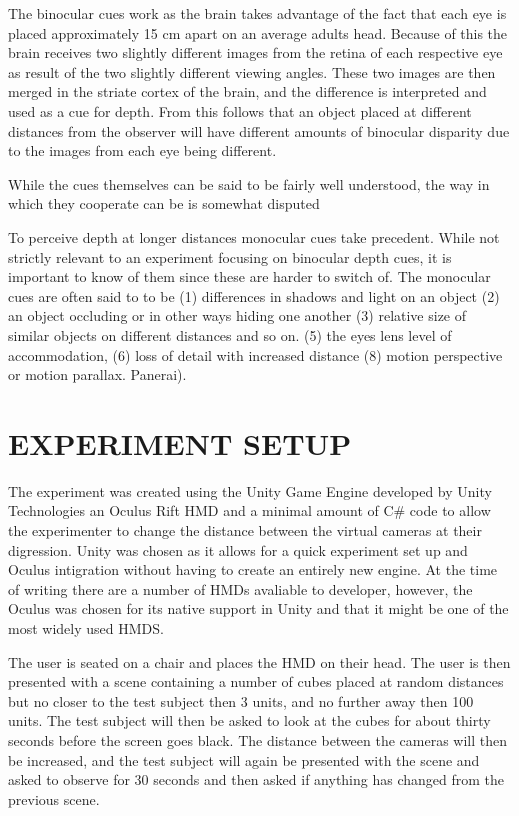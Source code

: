\documentclass[tog]{acmsiggraph}
\begin{document}
The binocular cues work as the brain takes advantage of the fact that each eye is placed approximately 15 cm apart on an average adults head. Because of this the brain receives two slightly different images from the retina of each respective eye as result of the two slightly different viewing angles. These two images are then merged in the striate cortex of the brain, and the difference is interpreted and used as a cue for depth. From this follows that an object placed at different distances from the observer will have different amounts of binocular disparity due to the images from each eye being different. 



While the cues themselves can be said to be fairly well understood, the way in which they cooperate can be is somewhat disputed ~\cite {Boyd:2000:DPC} 


To perceive depth at longer distances monocular cues take precedent. While not strictly relevant to an experiment focusing on binocular depth cues, it is important to know of them since these are harder to switch of. The monocular cues are often said to to be (1) differences in shadows and light on an object (2) an object occluding or in other ways hiding one another (3) relative size of similar objects on different distances and so on. (5) the eyes lens level of accommodation, (6) loss of detail with increased distance (8) motion perspective or motion parallax.
Panerai).





\section{EXPERIMENT SETUP}

The experiment was created using the Unity Game Engine developed by Unity Technologies an Oculus Rift HMD and a minimal amount of C\# code to allow the experimenter to change the distance between the virtual cameras at their digression. Unity was chosen as it allows for a quick experiment set up and Oculus intigration without having to create an entirely new engine.
At the time of writing there are a number of HMDs avaliable to developer, however, the Oculus was chosen for its native support in Unity and that it might be one of the most widely used HMDS.

The user is seated on a chair and places the HMD on their head. The user is then presented with a scene containing a number of cubes placed at random distances but no closer to the test subject then 3 units, and no further away then 100 units. The test subject will then be asked to look at the cubes for about thirty seconds before the screen goes black. The distance between the cameras will then be increased, and the test subject will again be presented with the scene and asked to observe for 30 seconds and then asked if anything has changed from the previous scene.  
\end{document}
